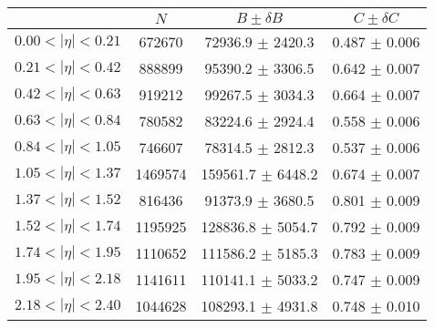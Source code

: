 \begin{tabular}{lccc}
\hline
    &   $N$   & $B \pm \delta B$  &  $C \pm \delta C$ \\
\hline
$0.00 < |\eta| <0.21$          & 672670     & 72936.9    $\pm$ 2420.3 & 0.487      $\pm$ 0.006 \\
$0.21 < |\eta| <0.42$          & 888899     & 95390.2    $\pm$ 3306.5 & 0.642      $\pm$ 0.007 \\
$0.42 < |\eta| <0.63$          & 919212     & 99267.5    $\pm$ 3034.3 & 0.664      $\pm$ 0.007 \\
$0.63 < |\eta| <0.84$          & 780582     & 83224.6    $\pm$ 2924.4 & 0.558      $\pm$ 0.006 \\
$0.84 < |\eta| <1.05$          & 746607     & 78314.5    $\pm$ 2812.3 & 0.537      $\pm$ 0.006 \\
$1.05 < |\eta| <1.37$          & 1469574    & 159561.7   $\pm$ 6448.2 & 0.674      $\pm$ 0.007 \\
$1.37 < |\eta| <1.52$          & 816436     & 91373.9    $\pm$ 3680.5 & 0.801      $\pm$ 0.009 \\
$1.52 < |\eta| <1.74$          & 1195925    & 128836.8   $\pm$ 5054.7 & 0.792      $\pm$ 0.009 \\
$1.74 < |\eta| <1.95$          & 1110652    & 111586.2   $\pm$ 5185.3 & 0.783      $\pm$ 0.009 \\
$1.95 < |\eta| <2.18$          & 1141611    & 110141.1   $\pm$ 5033.2 & 0.747      $\pm$ 0.009 \\
$2.18 < |\eta| <2.40$          & 1044628    & 108293.1   $\pm$ 4931.8 & 0.748      $\pm$ 0.010 \\
\hline
\end{tabular}
